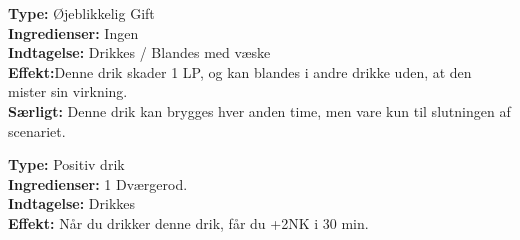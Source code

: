 \begin{gift*}[Nervegift]
    \textbf{Type:} Øjeblikkelig Gift\\
    \textbf{Ingredienser:} Ingen\\
    \textbf{Indtagelse:} Drikkes / Blandes med væske\\
    \textbf{Effekt:}Denne drik skader 1 LP, og kan blandes i andre drikke uden, at den mister sin virkning.\\
   \textbf{Særligt:} Denne drik kan brygges hver anden time, men vare kun til slutningen af scenariet.
\end{gift*}

\begin{drik*}
\textbf{Type:} Positiv drik\\
\textbf{Ingredienser:} 1 Dværgerod.\\
\textbf{Indtagelse:} Drikkes\\
\textbf{Effekt:} Når du drikker denne drik, får du +2NK i 30 min.
\end{drik*}
